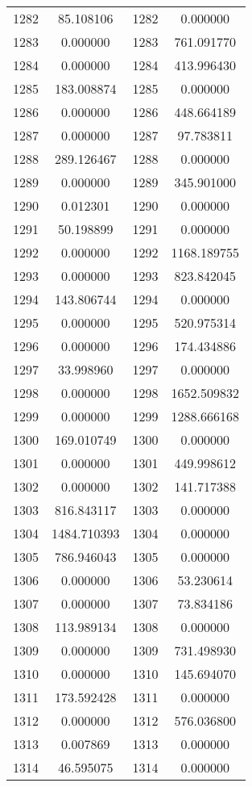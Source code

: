 \documentclass[12pt]{article}
\begin{document}
\begin{longtable}{@{}cccc@{}}
1282 & 85.108106 & 1282 & 0.000000 \\
1283 & 0.000000 & 1283 & 761.091770 \\
1284 & 0.000000 & 1284 & 413.996430 \\
1285 & 183.008874 & 1285 & 0.000000 \\
1286 & 0.000000 & 1286 & 448.664189 \\
1287 & 0.000000 & 1287 & 97.783811 \\
1288 & 289.126467 & 1288 & 0.000000 \\
1289 & 0.000000 & 1289 & 345.901000 \\
1290 & 0.012301 & 1290 & 0.000000 \\
1291 & 50.198899 & 1291 & 0.000000 \\
1292 & 0.000000 & 1292 & 1168.189755 \\
1293 & 0.000000 & 1293 & 823.842045 \\
1294 & 143.806744 & 1294 & 0.000000 \\
1295 & 0.000000 & 1295 & 520.975314 \\
1296 & 0.000000 & 1296 & 174.434886 \\
1297 & 33.998960 & 1297 & 0.000000 \\
1298 & 0.000000 & 1298 & 1652.509832 \\
1299 & 0.000000 & 1299 & 1288.666168 \\
1300 & 169.010749 & 1300 & 0.000000 \\
1301 & 0.000000 & 1301 & 449.998612 \\
1302 & 0.000000 & 1302 & 141.717388 \\
1303 & 816.843117 & 1303 & 0.000000 \\
1304 & 1484.710393 & 1304 & 0.000000 \\
1305 & 786.946043 & 1305 & 0.000000 \\
1306 & 0.000000 & 1306 & 53.230614 \\
1307 & 0.000000 & 1307 & 73.834186 \\
1308 & 113.989134 & 1308 & 0.000000 \\
1309 & 0.000000 & 1309 & 731.498930 \\
1310 & 0.000000 & 1310 & 145.694070 \\
1311 & 173.592428 & 1311 & 0.000000 \\
1312 & 0.000000 & 1312 & 576.036800 \\
1313 & 0.007869 & 1313 & 0.000000 \\
1314 & 46.595075 & 1314 & 0.000000 \\

\end{longtable}
\end{document}

